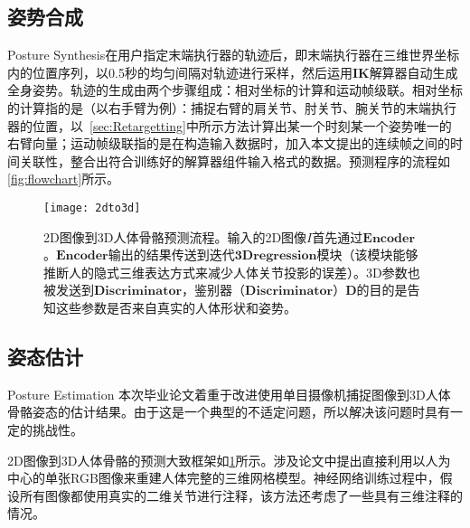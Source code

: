 \subsection{姿势合成}{Posture Synthesis}在用户指定末端执行器的轨迹后，即末端执行器在三维世界坐标内的位置序列，以0.5秒的均匀间隔对轨迹进行采样，然后运用$\mathbf{IK}$解算器自动生成全身姿势。轨迹的生成由两个步骤组成：相对坐标的计算和运动帧级联。相对坐标的计算指的是（以右手臂为例）：捕捉右臂的肩关节、肘关节、腕关节的末端执行器的位置，以~\ref{sec:Retargetting}中所示方法计算出某一个时刻某一个姿势唯一的右臂向量；运动帧级联指的是在构造输入数据时，加入本文提出的连续帧之间的时间关联性，整合出符合训练好的解算器组件输入格式的数据。预测程序的流程如\cref{fig:flowchart}所示。
\begin{figure}[!h]
	\centering
	\texttt{[image: 2dto3d]}
	\caption[]{\label{fig:2dto3d}
	2D图像到3D人体骨骼预测流程\cite{kanazawa2018end}。输入的2D图像$I$首先通过$\mathbf{Encoder}$。$\mathbf{Encoder}$输出的结果传送到迭代$\mathbf{3D regression}$模块（该模块能够推断人的隐式三维表达方式来减少人体关节投影的误差）。3D参数也被发送到$\mathbf{Discriminator}$，鉴别器（$\mathbf{Discriminator}$）$\mathbf{D}$的目的是告知这些参数是否来自真实的人体形状和姿势。
	}
\end{figure}
\subsection{姿态估计}{Posture Estimation}
本次毕业论文着重于改进使用单目摄像机捕捉图像到3D人体骨骼姿态的估计结果\cite{kanazawa2018end}。由于这是一个典型的不适定问题，所以解决该问题时具有一定的挑战性。

2D图像到3D人体骨骼的预测大致框架如\cref{fig:2dto3d}所示。涉及论文中提出直接利用以人为中心的单张RGB图像来重建人体完整的三维网格模型。神经网络训练过程中，假设所有图像都使用真实的二维关节进行注释，该方法还考虑了一些具有三维注释的情况。

